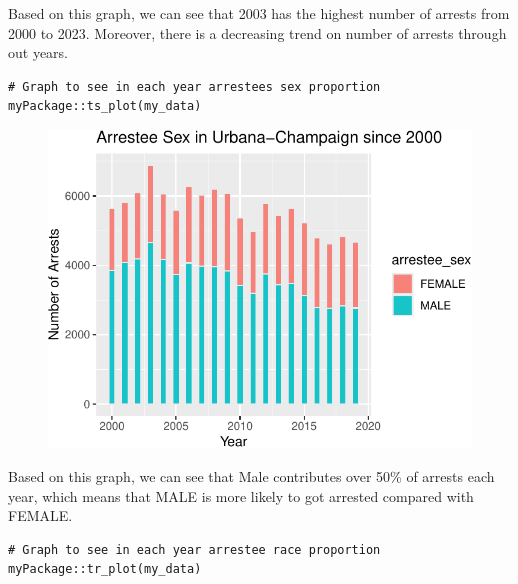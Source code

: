 \documentclass[
  article]{jss}
\begin{document}
Based on this graph, we can see that 2003 has the highest number of
arrests from 2000 to 2023. Moreover, there is a decreasing trend on
number of arrests through out years.

\begin{verbatim}
# Graph to see in each year arrestees sex proportion
myPackage::ts_plot(my_data)
\end{verbatim}

\begin{figure}[H]

{\centering \includegraphics{final-report_files/figure-pdf/unnamed-chunk-9-1.pdf}

}

\end{figure}

Based on this graph, we can see that Male contributes over 50\% of
arrests each year, which means that MALE is more likely to got arrested
compared with FEMALE.

\begin{verbatim}
# Graph to see in each year arrestee race proportion
myPackage::tr_plot(my_data)
\end{verbatim}
\end{document}
